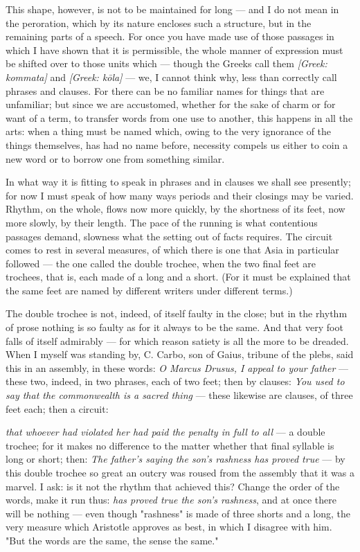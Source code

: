 This shape, however, is not to be maintained for long — and I do not mean in the peroration, which by its nature encloses such a structure, but in the remaining parts of a speech. For once you have made use of those passages in which I have shown that it is permissible, the whole manner of expression must be shifted over to those units which — though the Greeks call them \textit{[Greek: kommata]} and \textit{[Greek: kōla]} — we, I cannot think why, less than correctly call phrases and clauses. For there can be no familiar names for things that are unfamiliar; but since we are accustomed, whether for the sake of charm or for want of a term, to transfer words from one use to another, this happens in all the arts: when a thing must be named which, owing to the very ignorance of the things themselves, has had no name before, necessity compels us either to coin a new word or to borrow one from something similar.

 In what way it is fitting to speak in phrases and in clauses we shall see presently; for now I must speak of how many ways periods and their closings may be varied. Rhythm, on the whole, flows now more quickly, by the shortness of its feet, now more slowly, by their length. The pace of the running is what contentious passages demand, slowness what the setting out of facts requires. The circuit comes to rest in several measures, of which there is one that Asia in particular followed — the one called the double trochee, when the two final feet are trochees, that is, each made of a long and a short. (For it must be explained that the same feet are named by different writers under different terms.)

 The double trochee is not, indeed, of itself faulty in the close; but in the rhythm of prose nothing is so faulty as for it always to be the same. And that very foot falls of itself admirably — for which reason satiety is all the more to be dreaded. When I myself was standing by, C. Carbo, son of Gaius, tribune of the plebs, said this in an assembly, in these words: \textit{O Marcus Drusus, I appeal to your father} — these two, indeed, in two phrases, each of two feet; then by clauses: \textit{You used to say that the commonwealth is a sacred thing} — these likewise are clauses, of three feet each; then a circuit:

 \textit{that whoever had violated her had paid the penalty in full to all} — a double trochee; for it makes no difference to the matter whether that final syllable is long or short; then: \textit{The father's saying the son's rashness has proved true} — by this double trochee so great an outcry was roused from the assembly that it was a marvel. I ask: is it not the rhythm that achieved this? Change the order of the words, make it run thus: \textit{has proved true the son's rashness}, and at once there will be nothing — even though "rashness" is made of three shorts and a long, the very measure which Aristotle approves as best, in which I disagree with him. "But the words are the same, the sense the same."

